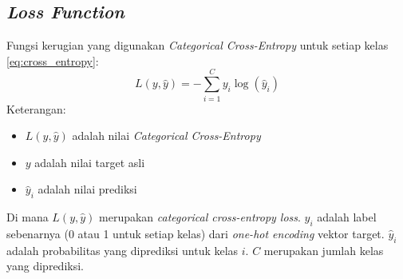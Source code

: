     \subsection{\textit{Loss Function}}
    Fungsi kerugian yang digunakan \textit{Categorical Cross-Entropy} untuk setiap kelas \ref{eq:cross_entropy}:
    \begin{equation}
        L(y, \hat{y}) = -\sum_{i=1}^{C} y_i \log(\hat{y}_i)
    \label{eq:cross_entropy}
    \end{equation}
    Keterangan:
    \begin{itemize}
        \item $L(y, \hat{y})$ adalah nilai \textit{Categorical Cross-Entropy}
        \item $y$ adalah nilai target asli
        \item $\hat{y}_i$ adalah nilai prediksi
    \end{itemize}
    
    Di mana $L(y, \hat{y})$ merupakan \textit{categorical cross-entropy loss}. $y_i$ adalah label sebenarnya (0 atau 1 untuk setiap kelas) dari \textit{one-hot encoding} vektor target. $\hat{y}_i$ adalah probabilitas yang diprediksi untuk kelas $i$. $C$ merupakan jumlah kelas yang diprediksi.

